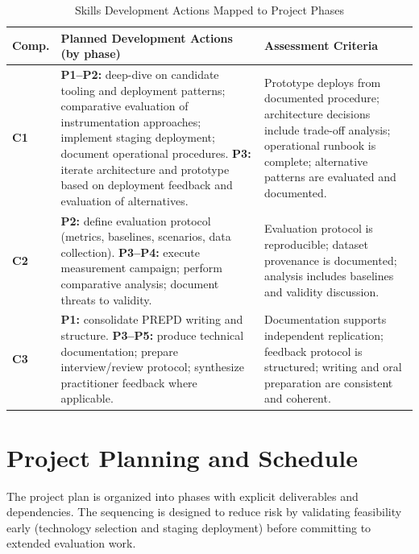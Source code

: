 \begin{table}[htbp]
\centering
\caption{Skills Development Actions Mapped to Project Phases}
\label{tab:development}
\footnotesize
\begin{tabular}{@{}p{}p{}p{}@{}}
		\toprule
		\textbf{Comp.} & \textbf{Planned Development Actions (by phase)} & \textbf{Assessment Criteria} \\
\midrule
		\textbf{C1} &
		\textbf{P1--P2:} deep-dive on candidate tooling and deployment patterns; comparative evaluation of instrumentation approaches; implement staging deployment; document operational procedures.\newline
		\textbf{P3:} iterate architecture and prototype based on deployment feedback and evaluation of alternatives. &
Prototype deploys from documented procedure; architecture decisions include trade-off analysis; operational runbook is complete; alternative patterns are evaluated and documented. \\
\addlinespace
		\textbf{C2} &
		\textbf{P2:} define evaluation protocol (metrics, baselines, scenarios, data collection).\newline
		\textbf{P3--P4:} execute measurement campaign; perform comparative analysis; document threats to validity. &
Evaluation protocol is reproducible; dataset provenance is documented; analysis includes baselines and validity discussion. \\
\addlinespace
		\textbf{C3} &
		\textbf{P1:} consolidate PREPD writing and structure.\newline
		\textbf{P3--P5:} produce technical documentation; prepare interview/review protocol; synthesize practitioner feedback where applicable. &
Documentation supports independent replication; feedback protocol is structured; writing and oral preparation are consistent and coherent. \\
\bottomrule
\end{tabular}
\end{table}

\section{Project Planning and Schedule}
\label{sec:ch3_planning}

The project plan is organized into phases with explicit deliverables and dependencies. The sequencing is designed to reduce risk by validating feasibility early (technology selection and staging deployment) before committing to extended evaluation work.

